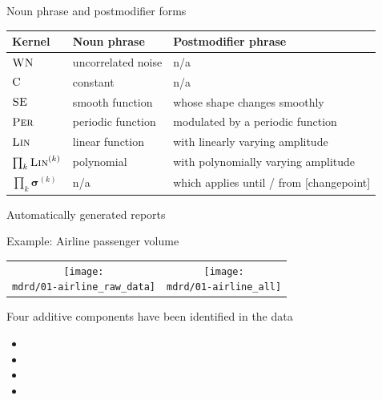 \begin{frame}{Noun phrase and postmodifier forms}
  \begin{center}
    \footnotesize
    \begin{tabular}{l|l|l}
      Kernel & Noun phrase & Postmodifier phrase \\
      \midrule
      ${\textsc{WN}}$  & uncorrelated noise & n/a\\
      ${\textsc{C}}$   & constant & n/a \\
      ${\textsc{SE}}$  & smooth function & whose shape changes smoothly\\
      ${\textsc{Per}}$ & periodic function & modulated by a periodic function\\
      ${\textsc{Lin}}$ & linear function & with linearly varying amplitude\\ 
      $\prod_k {\textsc{Lin}}^{(k)}$ & polynomial & with polynomially varying amplitude\\
      $\prod_k \boldsymbol{\sigma}^{(k)}$ & n/a & which applies until / from [changepoint]
    \end{tabular}
  \end{center}
\end{frame}

\begin{frame}{Automatically generated reports}
  
\end{frame}

\begin{frame}{Example: Airline passenger volume}
\newcommand{\wmgd}{0.5\columnwidth}
\newcommand{\hmgd}{3.0cm}
\newcommand{\mdrd}{figures/01-airline}
\newcommand{\mbm}{\hspace{-0.3cm}}
\begin{tabular}{cc}
\mbm \texttt{[image: \\mdrd/01-airline\_raw\_data]} & \texttt{[image: \\mdrd/01-airline\_all]}
\end{tabular}

{\footnotesize
Four additive components have been identified in the data
\begin{itemize}

  \item  

  \item  

  \item  

  \item  

\end{itemize}
}
\end{frame}

